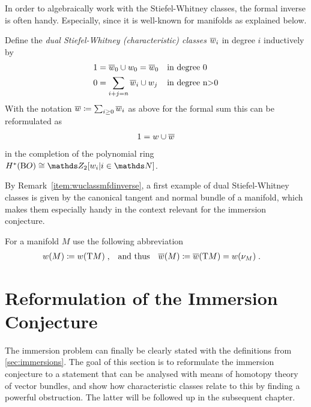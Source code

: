 In order to algebraically work with the Stiefel-Whitney classes, the
formal inverse is often handy. Especially, since it is well-known for
manifolds as explained below.
\begin{Def}
  Define the \emph{dual Stiefel-Whitney (characteristic) classes}
  $\overline{w}_{i}$ in degree $i$ inductively by
  \begin{align*}
    1 &= \overline{w}_{0}\cup w_{0} = \overline{w}_{0}    &&\text{in degree 0}\\
    0 &= \sum_{i+j=n} \overline{w}_{i}\cup w_{j}  &&\text{in degree n>0}
  \end{align*}
  With the notation $\overline{w}\coloneqq \sum_{i\geq0} \overline{w}_{i}$ as above
  for the formal sum this can be reformulated as
  \begin{gather*}
    1 = w\cup\overline{w}
  \end{gather*}
  in the completion of the polynomial ring $\H^*(\BO)\cong\Zmod2[\ws{i}|i\in\Nat]$.
\end{Def}
By
Remark~\ref{item:wuclassmfdinverse},
a first example of dual Stiefel-Whitney classes is given by the
canonical tangent and normal bundle of a manifold, which makes them
especially handy in the context relevant for the immersion conjecture.
\begin{Def}
  For a manifold $M$ use the following abbreviation
  \begin{align*}
    {w}(M) &\coloneqq {w}(\mathrm{T}M)
            \;,
    &\text{and thus}&
    &{\overline{w}}(M) &\coloneqq {\overline{w}}(\mathrm{T}M) = {w}(\nu_{M})
    \;.
  \end{align*}
\end{Def}

\section{Reformulation of the Immersion Conjecture}
\label{sec:reformulation}

The immersion problem can finally be clearly stated with the
definitions from \autoref{sec:immersions}.
The goal of this section is to reformulate the immersion conjecture to
a statement that can be analysed with means of homotopy theory of
vector bundles, and show how characteristic classes relate to this by
finding a powerful obstruction.
The latter will be followed up in the subsequent chapter.

